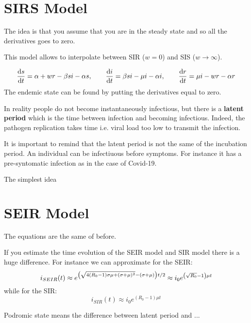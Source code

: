 \documentclass[../main/main.tex]{subfiles}
\begin{document}

\section{SIRS Model}

The idea is that you assume that you are in the steady state and so all the derivatives goes to zero.

This model allows to interpolate between SIR (\( w=0 \)) and SIS (\( w \rightarrow \infty  \)).

\begin{equation*}
  \dv{s}{t} = \alpha + w r - \beta  s i - \alpha s, \qquad \dv{i}{t} = \beta s i - \mu i - \alpha i, \qquad \dv{r}{t} = \mu i - w r - \alpha r
\end{equation*}
The endemic state can be found by putting the derivatives equal to zero.

In reality people do not become instantaneously infectious, but there is a \textbf{latent period} which is the time between infection and becoming infectious. Indeed, the pathogen replication takes time i.e. viral load too low to transmit the infection.

It is important to remind that the latent period is not the same of the incubation period. An individual can be infectiuous before symptoms. For instance it has a pre-syntomatic infection as in the case of Covid-19.

The simplest idea

\section{SEIR Model}
The equations are the same of before.

If you estimate the time evolution of the SEIR model and SIR model there is a huge difference. For instance we can approximate for the SEIR:
\begin{equation*}
  i_{SEIR} (t) \approx e^{\qty(\sqrt{4(R_0-1)\sigma \mu  + (\sigma + \mu )^2} -(\sigma +\mu ))t/2 } \approx i_0 e^{\qty(\sqrt{R_0} -1 ) \mu t}
\end{equation*}
while for the SIR:
\begin{equation*}
  i_{SIR} (t) \approx i_0 e^{(R_0-1) \mu t}
\end{equation*}

Podromic state means the difference between latent period and ...
\end{document}

